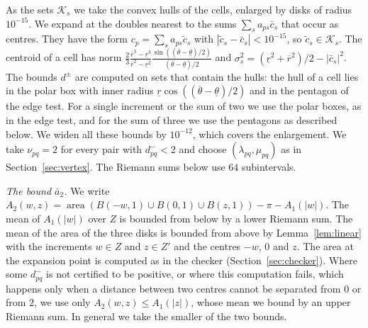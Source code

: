 \documentclass[11pt]{amsart}
\theoremstyle{definition}
\theoremstyle{remark}
\numberwithin{equation}{section}
\newcommand{\area}{\operatorname{area}}
\begin{document}
As the sets $\mathcal K_s$ we take the convex hulls of the cells, enlarged by disks of radius $10^{-15}$. We expand at the doubles nearest to the sums $\sum_sa_{ps}\bar c_s$ that occur as centres. They have the form $c_p=\sum_sa_{ps}\tilde c_s$ with $|\tilde c_s-\bar c_s|<10^{-15}$, so $\tilde c_s\in\mathcal K_s$. The centroid of a cell has norm $\frac23\frac{\overline r^3-\underline r^3}{\overline r^2-\underline r^2}\frac{\sin((\overline\theta-\underline\theta)/2)}{(\overline\theta-\underline\theta)/2}$ and $\sigma_s^2=(\underline r^2+\overline r^2)/2-|\bar c_s|^2$. The bounds $d^\pm$ are computed on sets that contain the hulls: the hull of a cell lies in the polar box with inner radius $\underline r\cos((\overline\theta-\underline\theta)/2)$ and in the pentagon of the edge test. For a single increment or the sum of two we use the polar boxes, as in the edge test, and for the sum of three we use the pentagons as described below. We widen all these bounds by $10^{-12}$, which covers the enlargement. We take $\nu_{pq}=2$ for every pair with $d^-_{pq}<2$ and choose $(\lambda_{pq},\mu_{pq})$ as in Section~\ref{sec:vertex}. The Riemann sums below use $64$ subintervals.

\emph{The bound $\bar a_2$.} We write $A_2(w,z)=\area(B(-w,1)\cup B(0,1)\cup B(z,1))-\pi-A_1(|w|)$. The mean of $A_1(|w|)$ over $Z$ is bounded from below by a lower Riemann sum. The mean of the area of the three disks is bounded from above by Lemma~\ref{lem:linear} with the increments $w\in Z$ and $z\in Z'$ and the centres $-w$, $0$ and $z$. The area at the expansion point is computed as in the checker (Section~\ref{sec:checker}). Where some $d^-_{pq}$ is not certified to be positive, or where this computation fails, which happens only when a distance between two centres cannot be separated from $0$ or from $2$, we use only $A_2(w,z)\le A_1(|z|)$, whose mean we bound by an upper Riemann sum. In general we take the smaller of the two bounds.
\end{document}
